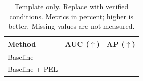 \begin{table}[t]
  \centering
  \caption{Template only. Replace with verified conditions. Metrics in percent; higher is better. Missing values are not measured.}
  \label{tab:experiment-results}
  \small
  \setlength{\tabcolsep}{4pt}
  \begin{tabular}{lrr}
    \toprule
    Method & AUC ($\uparrow$) & AP ($\uparrow$) \\
    \midrule
    Baseline & -- & -- \\
    Baseline + PEL & -- & -- \\
    \bottomrule
  \end{tabular}
\end{table}

